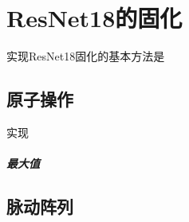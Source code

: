 
\chapter{ResNet18的固化}
实现ResNet18固化的基本方法是


\section{原子操作}
实现

\paragraph{最大值}




\section{脉动阵列}


